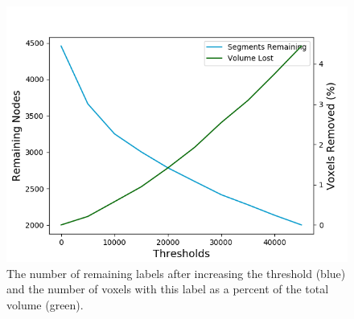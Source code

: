\begin{figure}
	\begin{center}
		\includegraphics[width=0.95\linewidth]{./figures/node-threshold.png}
		\caption{The number of remaining labels after increasing the threshold (blue) and the number of voxels with this label as a percent of the total volume (green). }
		\label{fig:node-pruning}
	\end{center}
\end{figure}
